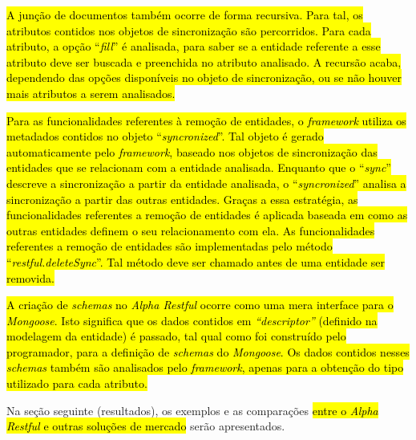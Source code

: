 \hl{A junção de documentos também ocorre de forma recursiva. Para tal, os atributos contidos nos objetos de sincronização são percorridos. Para cada atributo, a opção ``\textit{fill}'' é analisada, para saber se a entidade referente a esse atributo deve ser buscada e preenchida no atributo analisado. A recursão acaba, dependendo das opções disponíveis no objeto de sincronização, ou se não houver mais atributos a serem analisados.}

\hl{Para as funcionalidades referentes à remoção de entidades, o \textit{framework} utiliza os metadados contidos no objeto ``\textit{syncronized}''. Tal objeto é gerado automaticamente pelo \textit{framework}, baseado nos objetos de sincronização das entidades que se relacionam com a entidade analisada. Enquanto que o ``\textit{sync}'' descreve a sincronização a partir da entidade analisada, o ``\textit{syncronized}'' analisa a sincronização a partir das outras entidades. Graças a essa estratégia, as funcionalidades referentes a remoção de entidades é aplicada baseada em como as outras entidades definem o seu relacionamento com ela. As funcionalidades referentes a remoção de entidades são implementadas pelo método ``\textit{restful.deleteSync}''. Tal método deve ser chamado antes de uma entidade ser removida.}

\hl{A criação de \textit{schemas} no \textit{Alpha Restful} ocorre como uma mera interface para o \textit{Mongoose}. Isto significa que os dados contidos em \textit{``descriptor''} (definido na modelagem da entidade) é passado, tal qual como foi construído pelo programador, para a definição de \textit{schemas} do \textit{Mongoose}. Os dados contidos nesses \textit{schemas} também são analisados pelo \textit{framework}, apenas para a obtenção do tipo utilizado para cada atributo.}

Na seção seguinte (resultados), os exemplos e as comparações \hl{entre o \textit{Alpha Restful} e outras soluções de mercado} serão apresentados.


